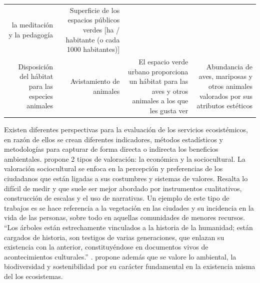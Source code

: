 \documentclass[12pt,]{book}
\begin{document}
\begin{longtable}[]{@{}rrrr@{}}
\begin{minipage}[t]{0.19\columnwidth}
la meditación y la pedagogía\strut
\end{minipage} & \begin{minipage}[t]{0.22\columnwidth}\raggedleft\strut
Superficie de los espacios públicos verdes {[}ha / habitante (o cada
1000 habitantes){]}\strut
\end{minipage}\tabularnewline
\begin{minipage}[t]{0.26\columnwidth}\raggedleft\strut
Disposición del hábitat para las especies animales\strut
\end{minipage} & \begin{minipage}[t]{0.22\columnwidth}\raggedleft\strut
Avistamiento de animales\strut
\end{minipage} & \begin{minipage}[t]{0.19\columnwidth}\raggedleft\strut
El espacio verde urbano proporciona un hábitat para las aves y otros
animales a los que les gusta ver\strut
\end{minipage} & \begin{minipage}[t]{0.22\columnwidth}\raggedleft\strut
Abundancia de aves, mariposas y otros animales valorados por sus
atributos estéticos\strut
\end{minipage}\tabularnewline
\bottomrule
\end{longtable}

Existen diferentes perspectivas para la evaluación de los servicios
ecosistémicos, en razón de ellos se crean diferentes indicadores,
métodos estadísticos y metodologías para capturar de forma directa o
indirecta los beneficios ambientales.
\citep{gomez-baggethun_classifying_2013} propone 2 tipos de valoración:
la económica y la sociocultural. La valoración sociocultural se enfoca
en la percepción y preferencias de los ciudadanos que están ligadas a
sus costumbres y sistemas de valores. Resalta lo difícil de medir y que
suele ser mejor abordado por instrumentos cualitativos, construcción de
escalas y el uso de narrativas. Un ejemplo de este tipo de trabajos es
\citep{garzon2004vegetacion} se hace referencia a la vegetación en las
ciudades y su incidencia en la vida de las personas, sobre todo en
aquellas comunidades de menores recursos. ``Los árboles están
estrechamente vinculados a la historia de la humanidad; están cargados
de historia, son testigos de varias generaciones, que enlazan su
existencia con la anterior, constituyéndose en documentos vivos de
acontecimientos culturales.'' \citep{ferro_medina_arboles_2010}.
\citep{konijnendijk_arboles_2005} propone además que se valore lo
ambiental, la biodiversidad y sostenibilidad por su carácter fundamental
en la existencia misma del los ecosistemas.
\end{document}
